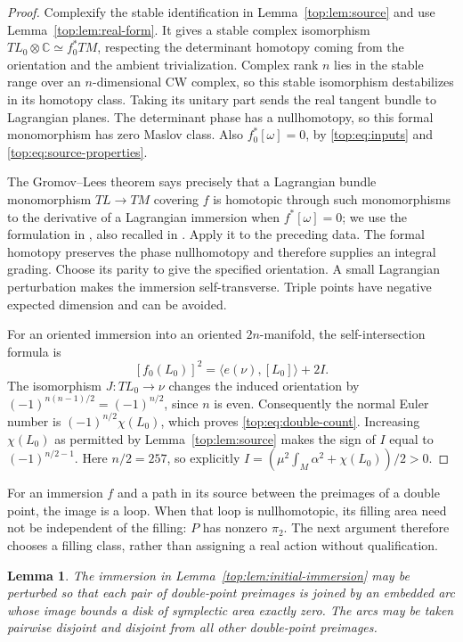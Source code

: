 \documentclass[11pt]{article}
\numberwithin{equation}{section}
\newtheorem{lemma}[theorem]{Lemma}
\theoremstyle{definition}
\theoremstyle{remark}
\newcommand{\C}{\mathbb C}
\begin{document}
\begin{proof}
Complexify the stable identification in
Lemma~\ref{top:lem:source} and use Lemma~\ref{top:lem:real-form}.  It
gives a stable complex isomorphism
$TL_0\otimes\C\simeq f_0^*TM$, respecting the determinant homotopy
coming from the orientation and the ambient trivialization.  Complex
rank $n$ lies in the stable range over an $n$-dimensional CW complex,
so this stable isomorphism destabilizes in its homotopy class.  Taking
its unitary part sends the real tangent bundle to Lagrangian planes.
The determinant phase has a nullhomotopy, so this formal monomorphism
has zero Maslov class.  Also $f_0^*[\omega]=0$, by
\eqref{top:eq:inputs} and \eqref{top:eq:source-properties}.

The Gromov--Lees theorem \cite{Top:Gromov,Top:Lees} says precisely that a Lagrangian bundle
monomorphism $TL\to TM$ covering $f$ is homotopic through such
monomorphisms to the derivative of a Lagrangian immersion when
$f^*[\omega]=0$; we use the formulation in
\cite[Theorem~16.3.2]{Top:EMbook}, also recalled in
\cite[Theorem~2.3]{Top:Rathel}.  Apply it to the preceding data.  The
formal homotopy preserves the phase nullhomotopy and therefore supplies
an integral grading.  Choose its parity to give the specified
orientation.  A small Lagrangian perturbation makes the immersion
self-transverse.  Triple points have negative expected dimension and
can be avoided.

For an oriented immersion into an oriented $2n$-manifold, the
self-intersection formula is
\[
 [f_0(L_0)]^2=\langle e(\nu),[L_0]\rangle+2I.
\]
The isomorphism $J:TL_0\to\nu$ changes the induced orientation by
$(-1)^{n(n-1)/2}=(-1)^{n/2}$, since $n$ is even.  Consequently the
normal Euler number is $(-1)^{n/2}\chi(L_0)$, which proves
\eqref{top:eq:double-count}.  Increasing $\chi(L_0)$ as permitted by
Lemma~\ref{top:lem:source} makes the sign of $I$ equal to
$(-1)^{n/2-1}$.
Here $n/2=257$, so explicitly
$I=(\mu^2\int_M\alpha^2+\chi(L_0))/2>0$.
\end{proof}

For an immersion $f$ and a path in its source between the preimages of
a double point, the image is a loop.  When that loop is nullhomotopic,
its filling area need not be independent of the filling: $P$ has
nonzero $\pi_2$.  The next argument therefore chooses a filling class,
rather than assigning a real action without qualification.

\begin{lemma}\label{top:lem:zero-actions}
The immersion in Lemma~\ref{top:lem:initial-immersion} may be perturbed
so that each pair of double-point preimages is joined by an embedded
arc whose image bounds a disk of symplectic area exactly zero.
The arcs may be taken pairwise disjoint and disjoint from all other
double-point preimages.
\end{lemma}
\end{document}
